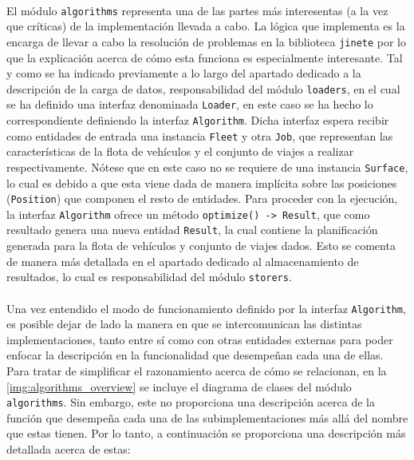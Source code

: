 \documentclass{subfiles}
\begin{document}
          \paragraph{}
          El módulo \texttt{algorithms} representa una de las partes más interesentas (a la vez que críticas) de la implementación llevada a cabo. La lógica que implementa es la encarga de llevar a cabo la resolución de problemas en la biblioteca \texttt{jinete} por lo que la explicación acerca de cómo esta funciona es especialmente interesante. Tal y como se ha indicado previamente a lo largo del apartado dedicado a la descripción de la carga de datos, responsabilidad del módulo \texttt{loaders}, en el cual se ha definido una interfaz denominada \texttt{Loader}, en este caso se ha hecho lo correspondiente definiendo la interfaz \texttt{Algorithm}. Dicha interfaz espera recibir como entidades de entrada una instancia \texttt{Fleet} y otra \texttt{Job}, que representan las características de la flota de vehículos y el conjunto de viajes a realizar respectivamente. Nótese que en este caso no se requiere de una instancia \texttt{Surface}, lo cual es debido a que esta viene dada de manera implícita sobre las posiciones (\texttt{Position}) que componen el resto de entidades. Para proceder con la ejecución, la interfaz \texttt{Algorithm} ofrece un método \verb|optimize() -> Result|, que como resultado genera una nueva entidad \texttt{Result}, la cual contiene la planificación generada para la flota de vehículos y conjunto de viajes dados. Esto se comenta de manera más detallada en el apartado dedicado al almacenamiento de resultados, lo cual es responsabilidad del módulo \texttt{storers}.

          \paragraph{}
          Una vez entendido el modo de funcionamiento definido por la interfaz \texttt{Algorithm}, es posible dejar de lado la manera en que se intercomunican las distintas implementaciones, tanto entre sí como con otras entidades externas para poder enfocar la descripción en la funcionalidad que desempeñan cada una de ellas. Para tratar de simplificar el razonamiento acerca de cómo se relacionan, en la \cref{img:algorithms_overview} se incluye el diagrama de clases del módulo \texttt{algorithms}. Sin embargo, este no proporciona una descripción acerca de la función que desempeña cada una de las subimplementaciones más allá del nombre que estas tienen. Por lo tanto, a continuación se proporciona una descripción más detallada acerca de estas: 
\end{document}
